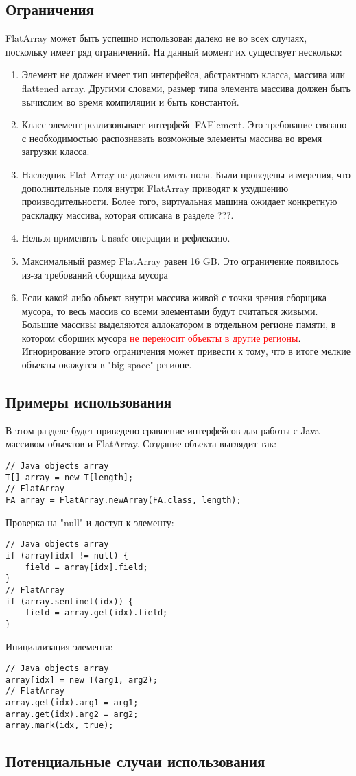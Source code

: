 \subsection{Ограничения}
FlatArray может быть успешно использован далеко не во всех случаях, поскольку имеет ряд ограничений. На данный момент их существует несколько:
\begin{enumerate}
	\item Элемент не должен имеет тип интерфейса, абстрактного класса, массива или flattened array. Другими словами, размер типа элемента массива должен быть вычислим во время компиляции и быть константой.
	\item Класс-элемент реализовывает интерфейс FAElement. Это требование связано с необходимостью распознавать возможные элементы массива во время загрузки класса.
	\item Наследник Flat Array не должен иметь поля. Были проведены измерения, что дополнительные поля внутри FlatArray приводят к ухудшению производительности. Более того, виртуальная машина ожидает конкретную раскладку массива, которая описана в разделе ???.
	\item Нельзя применять Unsafe операции и рефлексию.
	\item Максимальный размер FlatArray равен 16 GB. Это ограничение появилось из-за требований сборщика мусора
	\item Если какой либо объект внутри массива живой с точки зрения сборщика мусора, то весь массив со всеми элементами будут считаться живыми. Большие массивы выделяются аллокатором в отдельном регионе памяти, в котором сборщик мусора \textcolor{red}{ не переносит объекты в другие регионы}. Игнорирование этого ограничения может привести к тому, что в итоге мелкие объекты окажутся в "big space" регионе.
\end{enumerate}

\subsection{Примеры использования}
В этом разделе будет приведено сравнение интерфейсов для работы с Java массивом объектов и FlatArray. Создание объекта выглядит так:
\begin{lstlisting}
// Java objects array
T[] array = new T[length];
// FlatArray
FA array = FlatArray.newArray(FA.class, length);
\end{lstlisting}
Проверка на "null" и доступ к элементу:
\begin{lstlisting}
// Java objects array
if (array[idx] != null) {
	field = array[idx].field;
}
// FlatArray
if (array.sentinel(idx)) {
	field = array.get(idx).field;
}
\end{lstlisting}
Инициализация элемента:
\begin{lstlisting}
// Java objects array
array[idx] = new T(arg1, arg2);
// FlatArray
array.get(idx).arg1 = arg1;
array.get(idx).arg2 = arg2;
array.mark(idx, true);
\end{lstlisting}
\subsection{Потенциальные случаи использования}


\clearpage